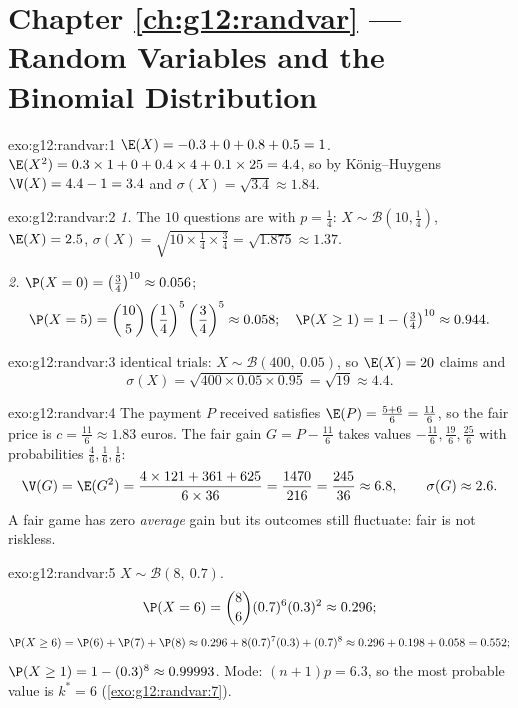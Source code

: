 \section*{Chapter \ref{ch:g12:randvar} --- Random Variables and the Binomial Distribution}

\begin{solution}{exo:g12:randvar:1}
$\E(X) = -0.3 + 0 + 0.8 + 0.5 = 1$.
$\E(X^2) = 0.3 \times 1 + 0 + 0.4\times4 + 0.1\times25 = 4.4$, so by
König--Huygens $\V(X) = 4.4 - 1 = 3.4$ and
$\sigma(X) = \sqrt{3.4} \approx 1.84$.
\end{solution}

\begin{solution}{exo:g12:randvar:2}
\emph{1.} The $10$ questions are   with
$p = \frac14$: $X \sim \mathcal B\left(10, \frac14\right)$,
$\E(X) = 2.5$,
$\sigma(X) = \sqrt{10 \times \frac14 \times \frac34} = \sqrt{1.875}
\approx 1.37$.

\emph{2.} $\P(X = 0) = \left(\frac34\right)^{10} \approx 0.056$;
\[
\P(X = 5) = \binom{10}{5}\left(\frac14\right)^5\left(\frac34\right)^5
\approx 0.058;
\quad
\P(X \geq 1) = 1 - \left(\tfrac34\right)^{10} \approx 0.944 .
\]
\end{solution}

\begin{solution}{exo:g12:randvar:3}
 identical trials: $X \sim \mathcal B(400,\ 0.05)$, so
$\E(X) = 20$ claims and
\[
\sigma(X) = \sqrt{400 \times 0.05 \times 0.95} = \sqrt{19} \approx 4.4 .
\]
\end{solution}

\begin{solution}{exo:g12:randvar:4}
The payment $P$ received satisfies
$\E(P) = \frac{5 + 6}{6} = \frac{11}{6}$, so the fair price is
$c = \frac{11}{6} \approx 1.83$ euros. The fair gain $G = P - \frac{11}6$
takes values $-\frac{11}{6}, \frac{19}{6}, \frac{25}{6}$ with probabilities
$\frac46, \frac16, \frac16$:
\[
\V(G) = \E(G^2)
= \frac{4 \times 121 + 361 + 625}{6 \times 36} = \frac{1470}{216}
= \frac{245}{36} \approx 6.8,
\qquad \sigma(G) \approx 2.6 .
\]
A fair game has zero \emph{average} gain but its outcomes still fluctuate:
fair is not riskless.
\end{solution}

\begin{solution}{exo:g12:randvar:5}
$X \sim \mathcal B(8,\ 0.7)$.
\[
\P(X = 6) = \binom86 (0.7)^6(0.3)^2 \approx 0.296 ;
\]
\[
\P(X \geq 6) = \P(6) + \P(7) + \P(8)
\approx 0.296 + 8(0.7)^7(0.3) + (0.7)^8
\approx 0.296 + 0.198 + 0.058 = 0.552 ;
\]
$\P(X \geq 1) = 1 - (0.3)^8 \approx 0.99993$. Mode:
$(n+1)p = 6.3$, so the most probable value is $k^* = 6$
(\cref{exo:g12:randvar:7}).
\end{solution}

